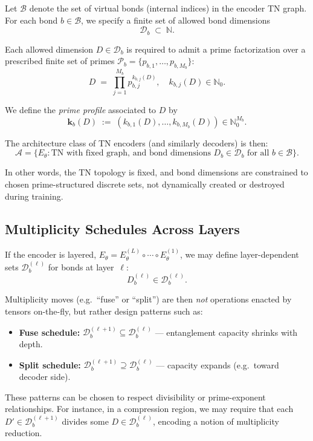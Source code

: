 \documentclass[11pt]{article}
\begin{document}
Let $\mathcal{B}$ denote the set of virtual bonds (internal indices) in the encoder TN graph. For each bond $b\in \mathcal{B}$, we specify a finite set of allowed bond dimensions
\[
\mathcal{D}_b \;\subset\; \mathbb{N}.
\]

Each allowed dimension $D\in\mathcal{D}_b$ is required to admit a prime factorization over a prescribed finite set of primes $\mathcal{P}_b = \{p_{b,1},\dots,p_{b,M_b}\}$:
\[
D \;=\; \prod_{j=1}^{M_b} p_{b,j}^{k_{b,j}(D)},
\quad 
k_{b,j}(D)\in\mathbb{N}_0.
\]

We define the \emph{prime profile} associated to $D$ by
\[
\mathbf{k}_b(D) \;:=\; (k_{b,1}(D),\dots,k_{b,M_b}(D)) \in \mathbb{N}_0^{M_b}.
\]

The architecture class of TN encoders (and similarly decoders) is then:
\[
\mathcal{A} = \{ E_\theta:
\text{TN with fixed graph, and bond dimensions } D_b \in\mathcal{D}_b \text{ for all } b\in\mathcal{B} \}.
\]

In other words, the TN topology is fixed, and bond dimensions are constrained to chosen prime-structured discrete sets, not dynamically created or destroyed during training.

\subsection{Multiplicity Schedules Across Layers}

If the encoder is layered, $E_\theta = E_\theta^{(L)}\circ\cdots\circ E_\theta^{(1)}$, we may define layer-dependent sets $\mathcal{D}_b^{(\ell)}$ for bonds at layer~$\ell$:
\[
D_b^{(\ell)} \in \mathcal{D}_b^{(\ell)}.
\]

Multiplicity moves (e.g.\ ``fuse'' or ``split'') are then \emph{not} operations enacted by tensors on-the-fly, but rather design patterns such as:
\begin{itemize}[leftmargin=1.5em]
    \item \textbf{Fuse schedule:} $\mathcal{D}^{(\ell+1)}_b \subseteq \mathcal{D}^{(\ell)}_b$ --- entanglement capacity shrinks with depth.
    \item \textbf{Split schedule:} $\mathcal{D}^{(\ell+1)}_b \supseteq \mathcal{D}^{(\ell)}_b$ --- capacity expands (e.g.\ toward decoder side).
\end{itemize}

These patterns can be chosen to respect divisibility or prime-exponent relationships. For instance, in a compression region, we may require that each $D' \in \mathcal{D}_b^{(\ell+1)}$ divides some $D \in \mathcal{D}_b^{(\ell)}$, encoding a notion of multiplicity reduction.
\newpage
\end{document}
